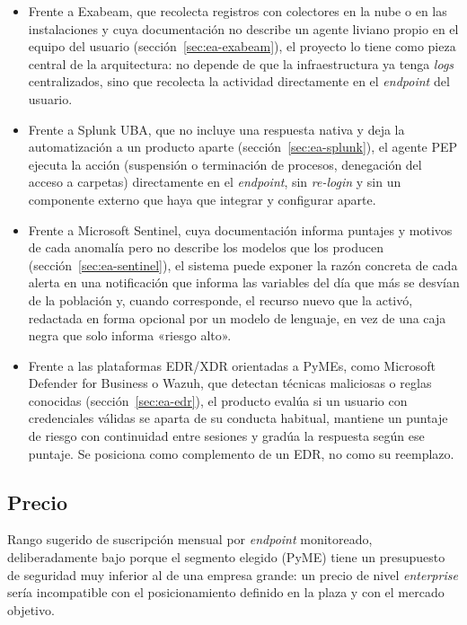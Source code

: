 \begin{itemize}
	\item Frente a Exabeam, que recolecta registros con colectores en la nube o en las instalaciones y cuya documentación no describe un agente liviano propio en el equipo del usuario (sección~\ref{sec:ea-exabeam}), el proyecto lo tiene como pieza central de la arquitectura: no depende de que la infraestructura ya tenga \emph{logs} centralizados, sino que recolecta la actividad directamente en el \emph{endpoint} del usuario.
	\item Frente a Splunk UBA, que no incluye una respuesta nativa y deja la automatización a un producto aparte (sección~\ref{sec:ea-splunk}), el agente PEP ejecuta la acción (suspensión o terminación de procesos, denegación del acceso a carpetas) directamente en el \emph{endpoint}, sin \emph{re-login} y sin un componente externo que haya que integrar y configurar aparte.
	\item Frente a Microsoft Sentinel, cuya documentación informa puntajes y motivos de cada anomalía pero no describe los modelos que los producen (sección~\ref{sec:ea-sentinel}), el sistema
 puede exponer la razón concreta de cada alerta en una notificación que informa las variables del día que más se desvían de la población y, cuando corresponde, el recurso nuevo que la activó, redactada en forma opcional por un modelo de lenguaje, en vez de una caja negra que solo informa «riesgo alto».
	\item Frente a las plataformas EDR/XDR orientadas a PyMEs, como Microsoft Defender for Business o Wazuh, que detectan técnicas maliciosas o reglas conocidas (sección~\ref{sec:ea-edr}), el producto evalúa si un usuario con credenciales válidas se aparta de su conducta habitual, mantiene un puntaje de riesgo con continuidad entre sesiones y gradúa la respuesta según ese puntaje. Se posiciona como complemento de un EDR, no como su reemplazo.
\end{itemize}

\subsection{Precio}
Rango sugerido de suscripción mensual por \emph{endpoint} monitoreado, deliberadamente bajo porque el segmento elegido (PyME) tiene un presupuesto de seguridad muy inferior al de una empresa grande: un precio de nivel \emph{enterprise} sería incompatible con el posicionamiento definido en la plaza y con el mercado objetivo.

